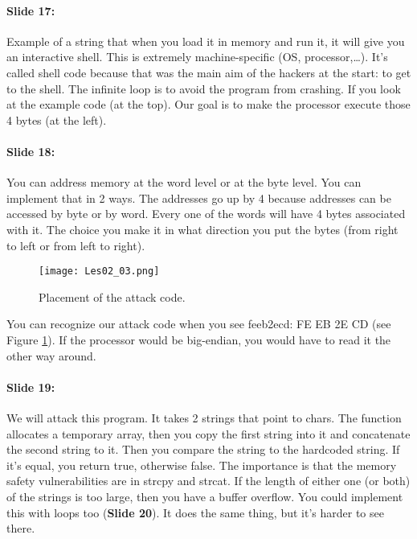 \documentclass[10pt,a4paper]{report}
\begin{document}
\paragraph{Slide 17:} Example of a string that when you load it in memory and run it, it will give you an interactive shell. This is extremely machine-specific (OS, processor,…). It's called shell code because that was the main aim of the hackers at the start: to get to the shell.
The infinite loop is to avoid the program from crashing. If you look at the example code (at the top). Our goal is to make the processor execute those 4 bytes (at the left).

\paragraph{Slide 18:} You can address memory at the word level or at the byte level. You can implement that in 2 ways. The addresses go up by 4 because addresses can be accessed by byte or by word. Every one of the words will have 4 bytes associated with it. The choice you make it in what direction you put the bytes (from right to left or from left to right).

\begin{figure}[ht!]
\centering
\texttt{[image: Les02\_03.png]}
\caption{Placement of the attack code.} 
\label{les02_03}
\end{figure}

You can recognize our attack code when you see feeb2ecd: FE EB 2E CD (see Figure \ref{les02_03}). If the processor would be big-endian, you would have to read it the other way around.

\paragraph{Slide 19:} We will attack this program. It takes 2 strings that point to chars. The function allocates a temporary array, then you copy the first string into it and concatenate the second string to it. Then you compare the string to the hardcoded string. If it's equal, you return true, otherwise false. The importance is that the memory safety vulnerabilities are in strcpy and strcat. If the length of either one (or both) of the strings is too large, then you have a buffer overflow. You could implement this with loops too (\textbf{Slide 20}). It does the same thing, but it's harder to see there. 
\end{document}
